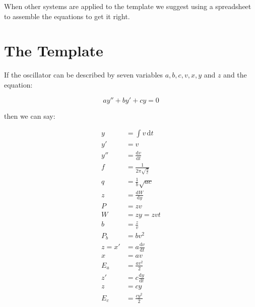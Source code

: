 \documentclass[]{../common/elementary-physics}
\begin{document}
\begin{figure}[ht] \centering
\end{figure}

When other systems are applied to the template we suggest using a spreadsheet to assemble the equations to get it right.

\pagebreak

\section{The Template}

If the oscillator can be described by seven variables $a,b,c,v,x,y$ and $z$ and the equation:

\begin{equation}
a y'' + b y' + c y = 0
\end{equation}

then we can say:

\begin{subequations}
\begin{align}
y &= \int v \, \mathrm{d}t \\
y' &= v \\
y'' &= \frac{\mathrm{d}v}{\mathrm{d}t} \\
f &= \frac{1}{2 \pi \sqrt{\frac{a}{c}}} \tag{frequency} \\
q &= \frac{1}{b} \sqrt{a c} \tag{quality factor}\\
z &= \frac{\mathrm{d}W}{\mathrm{d}y} \\
P &= z v \tag{power} \\
W &= z y = z v t \tag{work} \\
b &= \frac{z}{v} \tag{parasite} \\
P_b &= b v^2 \tag{losses} \\
z = x' &= a \frac{\mathrm{d}v}{\mathrm{d}t} \\
x &= a v \\
E_a &= \frac{a v^2}{2} \tag{energy} \\
z' &= c \frac{\mathrm{d}y}{\mathrm{d}t} \\
z &= c y \\
E_c &= \frac{c y^2}{2} \tag{energy} 
\end{align}
\end{subequations}
\end{document}
